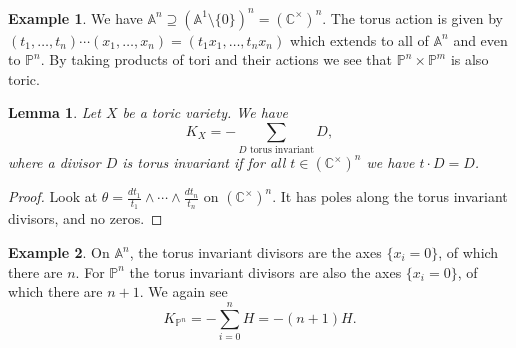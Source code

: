 \documentclass{article}
\newtheorem*{lemma}{Lemma}
\theoremstyle{definition}
\newtheorem*{example}{Example}
\newcommand{\A}{\mathbb{A}}
\renewcommand{\P}{\mathbb{P}}
\newcommand{\C}{\mathbb{C}}
\begin{document}
\begin{example}
    We have $\A^n\supseteq(\A^1\setminus\{0\})^n=(\C^\times)^n$. The torus
    action is given by
    $(t_1,\ldots,t_n)\cdots(x_1,\ldots,x_n)=(t_1x_1,\ldots,t_nx_n)$ which
    extends to all of $\A^n$ and even to $\P^n$. By taking products of tori and
    their actions we see that $\P^n\times\P^m$ is also toric.
\end{example}

\begin{lemma}
    Let $X$ be a toric variety. We have
    \begin{equation*}
        K_X = -\sum_{\text{$D$ torus invariant}}D,
    \end{equation*}
    where a divisor $D$ is torus invariant if for all $t\in(\C^\times)^n$ we
    have $t\cdot D=D$.
\end{lemma}

\begin{proof}
    Look at $\theta=\frac{dt_1}{t_1}\wedge\cdots\wedge\frac{dt_n}{t_n}$ on
    $(\C^\times)^n$. It has poles along the torus invariant divisors, and no
    zeros.
\end{proof}

\begin{example}
    On $\A^n$, the torus invariant divisors are the axes $\{x_i=0\}$, of which
    there are $n$. For $\P^n$ the torus invariant divisors are also the axes
    $\{x_i=0\}$, of which there are $n+1$. We again see
    \begin{equation*}
        K_{\P^n}=-\sum_{i=0}^nH=-(n+1)H.
    \end{equation*}
\end{example}
\end{document}
